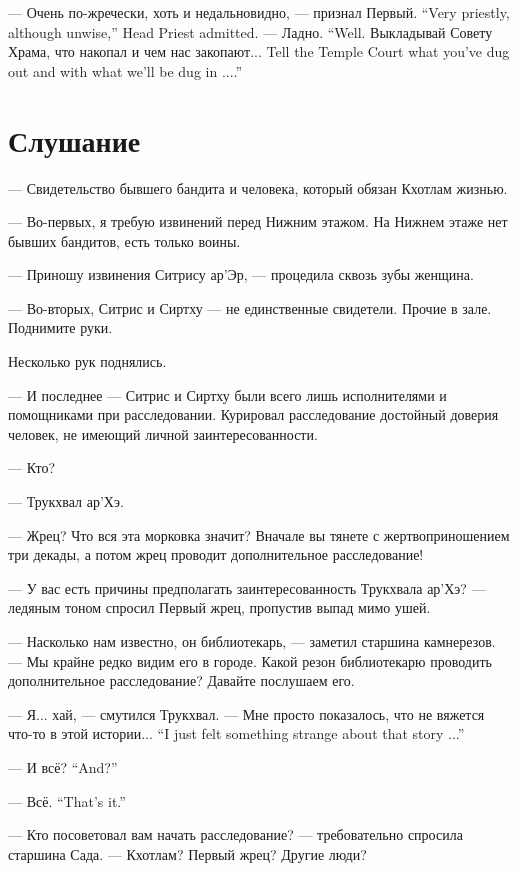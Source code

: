 {--- Очень по-жречески, хоть и недальновидно, --- признал Первый.}
{``Very priestly, although unwise,'' Head Priest admitted.}
{--- Ладно.}
{``Well.}
{Выкладывай Совету Храма, что накопал и чем нас закопают...}
{Tell the Temple Court what you've dug out and with what we'll be dug in ....''}

\section{Слушание}

--- Свидетельство бывшего бандита и человека, который обязан Кхотлам жизнью.

--- Во-первых, я требую извинений перед Нижним этажом.
На Нижнем этаже нет бывших бандитов, есть только воины.

--- Приношу извинения Ситрису ар'Эр, --- процедила сквозь зубы женщина.

--- Во-вторых, Ситрис и Сиртху --- не единственные свидетели.
Прочие в зале.
Поднимите руки.

Несколько рук поднялись.

--- И последнее --- Ситрис и Сиртху были всего лишь исполнителями и помощниками при расследовании.
Курировал расследование достойный доверия человек, не имеющий личной заинтересованности.

--- Кто?

--- Трукхвал ар'Хэ.

--- Жрец?
Что вся эта морковка значит?
Вначале вы тянете с жертвоприношением три декады, а потом жрец проводит дополнительное расследование!

--- У вас есть причины предполагать заинтересованность Трукхвала ар'Хэ? --- ледяным тоном спросил Первый жрец, пропустив выпад мимо ушей.

--- Насколько нам известно, он библиотекарь, --- заметил старшина камнерезов.
--- Мы крайне редко видим его в городе.
Какой резон библиотекарю проводить дополнительное расследование?
Давайте послушаем его.

--- Я... хай, --- смутился Трукхвал.
{--- Мне просто показалось, что не вяжется что-то в этой истории...}
{``I just felt something strange about that story ...''}

{--- И всё?}
{``And?''}

{--- Всё.}
{``That's it.''}

--- Кто посоветовал вам начать расследование? --- требовательно спросила старшина Сада.
--- Кхотлам?
Первый жрец?
Другие люди?

